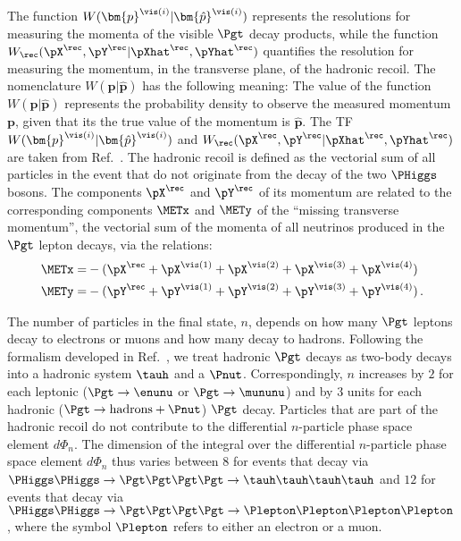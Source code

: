 The function $W(\bm{p}^{\vis(i)}|\bm{\hat{p}}^{\vis(i)})$ represents the resolutions for measuring the momenta of the visible $\Pgt$ decay products,
while the function $W_{\rec}( \pX^{\rec},\pY^{\rec} | \pXhat^{\rec},\pYhat^{\rec} )$ quantifies the resolution for measuring the momentum, in the transverse plane, of the hadronic recoil.
The nomenclature $W(\bm{p}|\bm{\hat{p}})$ has the following meaning:
The value of the function $W(\bm{p}|\bm{\hat{p}})$ represents the probability density to observe the measured momentum $\bm{p}$,
given that its the true value of the momentum is $\bm{\hat{p}}$.
The TF $W(\bm{p}^{\vis(i)}|\bm{\hat{p}}^{\vis(i)})$ and $W_{\rec}( \pX^{\rec},\pY^{\rec} | \pXhat^{\rec},\pYhat^{\rec} )$ are taken from Ref.~\cite{SVfitMEM}.
The hadronic recoil is defined as the vectorial sum of all particles in the event that do not originate from the decay of the two $\PHiggs$ bosons.
The components $\pX^{\rec}$ and $\pY^{\rec}$ of its momentum are related to the corresponding components $\METx$ and $\METy$ of the ``missing transverse momentum'',
the vectorial sum of the momenta of all neutrinos produced in the $\Pgt$ lepton decays, via the relations:
\begin{align}
\METx = & -( \pX^{\rec} + \pX^{\vis(1)} + \pX^{\vis(2)} + \pX^{\vis(3)} + \pX^{\vis(4)} ) \nonumber \\
\METy = & -( \pY^{\rec} + \pY^{\vis(1)} + \pY^{\vis(2)} + \pY^{\vis(3)} + \pY^{\vis(4)} ) \nonumber \, .
\end{align}

The number of particles in the final state, $n$, depends on how many $\Pgt$ leptons decay to electrons or muons 
and how many decay to hadrons.
Following the formalism developed in Ref.~\cite{SVfitMEM}, 
we treat hadronic $\Pgt$ decays as two-body decays into a hadronic system $\tauh$ and a $\Pnut$.
Correspondingly, $n$ increases by $2$ for each leptonic ($\Pgt \to \enunu$ or $\Pgt \to \mununu$) and by $3$ units for each hadronic ($\Pgt \to \textrm{hadrons} + \Pnut$) $\Pgt$ decay.
Particles that are part of the hadronic recoil do not contribute to the differential $n$-particle phase space element $d\Phi_{n}$.
The dimension of the integral over the differential $n$-particle phase space element $d\Phi_{n}$ thus
varies between $8$ for events that decay via $\PHiggs\PHiggs \to \Pgt\Pgt\Pgt\Pgt \to \tauh\tauh\tauh\tauh$ 
and $12$ for events that decay via $\PHiggs\PHiggs \to \Pgt\Pgt\Pgt\Pgt \to \Plepton\Plepton\Plepton\Plepton$,
where the symbol $\Plepton$ refers to either an electron or a muon.

